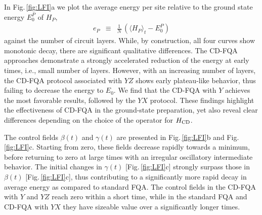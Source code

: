 \documentclass[twocolumn,aps,superscriptaddress,floatfix,longbibliography]{revtex4-2}
\newcommand{\Fig}[1]{Fig.\,\ref{fig:#1}}
\def\YX{\ensuremath{\mathit{YX}}\xspace} %
\def\YZ{\ensuremath{\mathit{YZ}}\xspace}
\begin{document}
In \Fig{LFI}a we plot
the average energy per site relative to the ground state energy
$E_0^P$ of $H_P$,
\begin{eqnarray}
   e_P &\equiv& 
   \tfrac{1}{N}\, (\langle H_P\rangle_t -E_0^P)
\label{eq:ep}
\end{eqnarray}
against the number of circuit layers. While, by construction,
all four curves show monotonic decay,
there are significant qualitative differences. 
The %
CD-FQA approaches demonstrate a strongly accelerated 
reduction of the energy at early times, i.e.,
small number of layers. However, with
an increasing number of layers, the CD-FQA protocol associated
with \YZ shows early plateau-like behavior, 
thus failing to decrease the energy to $E_0$. 
We find that the CD-FQA with $Y$ achieves the
most favorable results, followed by the \YX protocol.
These findings highlight the effectiveness of CD-FQA in the
ground-state preparation, yet also reveal clear differences
depending on the choice of the
operator for $H_{\rm CD}$.

The control fields $\beta(t)$ and $\gamma(t)$ are presented in
\Fig{LFI}b and \Fig{LFI}c. 
Starting from %
zero, these fields decrease rapidly towards a minimum, before returning to zero at large times
with an irregular oscillatory intermediate behavior.
The initial changes in $\gamma(t)$ [\Fig{LFI}c] strongly
surpass those in $\beta(t)$ [\Fig{LFI}c], thus
contributing to a significantly more rapid decay in average
energy as
compared to standard FQA. 
The control fields in the CD-FQA with
$Y$ and \YZ reach zero within a short time, while in the
standard FQA and CD-FQA with \YX
they have sizeable value over a significantly longer
times.
\end{document}
